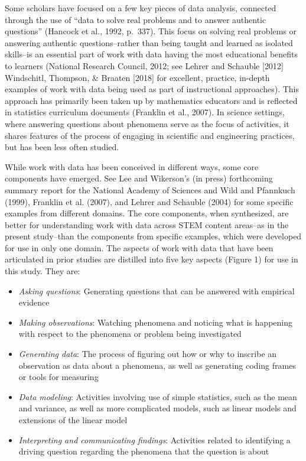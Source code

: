 \documentclass[]{book}
\providecommand{\tightlist}{%
  \setlength{\itemsep}{0pt}\setlength{\parskip}{0pt}}
\theoremstyle{definition}
\theoremstyle{definition}
\theoremstyle{definition}
\theoremstyle{remark}
\begin{document}
Some scholars have focused on a few key pieces of data analysis,
connected through the use of ``data to solve real problems and to answer
authentic questions'' (Hancock et al., 1992, p.~337). This focus on
solving real problems or answering authentic questions--rather than
being taught and learned as isolated skills--is an essential part of
work with data having the most educational benefits to learners
(National Research Council, 2012; see Lehrer and Schauble {[}2012{]}
Windschitl, Thompson, \& Braaten {[}2018{]} for excellent, practice,
in-depth examples of work with data being used as part of instructional
approaches). This approach has primarily been taken up by mathematics
educators and is reflected in statistics curriculum documents (Franklin
et al., 2007). In science settings, where answering questions about
phenomena serve as the focus of activities, it shares features of the
process of engaging in scientific and engineering practices, but has
been less often studied.

While work with data has been conceived in different ways, some core
components have emerged. See Lee and Wikerson's (in press) forthcoming
summary report for the National Academy of Sciences and Wild and
Pfannkuch (1999), Franklin et al. (2007), and Lehrer and Schauble (2004)
for some specific examples from different domains. The core components,
when synthesized, are better for understanding work with data across
STEM content areas--as in the present study--than the components from
specific examples, which were developed for use in only one domain. The
aspects of work with data that have been articulated in prior studies
are distilled into five key aspects (Figure 1) for use in this study.
They are:

\begin{itemize}
\tightlist
\item
  \emph{Asking questions}: Generating questions that can be answered
  with empirical evidence
\item
  \emph{Making observations}: Watching phenomena and noticing what is
  happening with respect to the phenomena or problem being investigated
\item
  \emph{Generating data}: The process of figuring out how or why to
  inscribe an observation as data about a phenomena, as well as
  generating coding frames or tools for measuring
\item
  \emph{Data modeling}: Activities involving use of simple statistics,
  such as the mean and variance, as well as more complicated models,
  such as linear models and extensions of the linear model
\item
  \emph{Interpreting and communicating findings}: Activities related to
  identifying a driving question regarding the phenomena that the
  question is about
\end{itemize}
\end{document}

